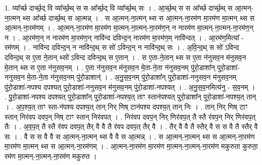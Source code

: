 \documentclass[17pt]{extarticle}
\begin{document}
1. व्या᳚र्च्छ दार्च्छ॒द् वि व्या᳚र्च्छ॒थ् स स आ᳚र्च्छ॒द् वि व्या᳚र्च्छ॒थ् सः । . आ॒र्च्छ॒थ् स स आ᳚र्च्छ दार्च्छ॒थ् स आ॒त्मन्-ना॒त्मन् थ्स आ᳚र्च्छ दार्च्छ॒थ् स आ॒त्मन्न् । . स आ॒त्मन्-ना॒त्मन् थ्स स आ॒त्मन्-ना॒रम॑ण मा॒रम॑ण मा॒त्मन् थ्स स आ॒त्मन्-ना॒रम॑णम् । . आ॒त्मन्-ना॒रम॑ण मा॒रम॑ण मा॒त्मन्-ना॒त्मन्-ना॒रम॑ण॒न् न नारम॑ण मा॒त्मन्-ना॒त्मन्-ना॒रम॑ण॒न् न । . आ॒रम॑ण॒न् न नारम॑ण मा॒रम॑ण॒न् नावि॑न्द दविन्द॒न् नारम॑ण मा॒रम॑ण॒म् नावि॑न्दत् । . आ॒रम॑ण॒मित्या᳚ - रम॑णम् । . नावि॑न्द दविन्द॒न् न नावि॑न्द॒थ् स सो॑ ऽविन्द॒न् न नावि॑न्द॒थ् सः । . अ॒वि॒न्द॒थ् स सो॑ ऽविन्द दविन्द॒थ् स ए॒ता ने॒तान् थ्सो॑ ऽविन्द दविन्द॒थ् स ए॒तान् । . स ए॒ता-ने॒तान् थ्स स ए॒ता न॑नुसव॒न म॑नुसव॒न मे॒तान् थ्स स ए॒ता न॑नुसव॒नम् । . ए॒ता न॑नुसव॒न म॑नुसव॒न मे॒ता-ने॒ता न॑नुसव॒नम् पु॑रो॒डाशा᳚न् पुरो॒डाशा॑-ननुसव॒न मे॒ता-ने॒ता न॑नुसव॒नम् पु॑रो॒डाशान्॑ । . अ॒नु॒स॒व॒नम् पु॑रो॒डाशा᳚न् पुरो॒डाशा॑-ननुसव॒न म॑नुसव॒नम् पु॑रो॒डाशा॑-नपश्य दपश्यत् पुरो॒डाशा॑-ननुसव॒न म॑नुसव॒नम् पु॑रो॒डाशा॑-नपश्यत् । . अ॒नु॒स॒व॒नमित्य॑नु - स॒व॒नम् । . पु॒रो॒डाशा॑-नपश्य दपश्यत् पुरो॒डाशा᳚न् पुरो॒डाशा॑-नपश्य॒त् ताꣳ स्तान॑पश्यत् पुरो॒डाशा᳚न् पुरो॒डाशा॑-नपश्य॒त् तान् । . अ॒प॒श्य॒त् ताꣳ स्ता-न॑पश्य दपश्य॒त् तान् निर् णिष् टान॑पश्य दपश्य॒त् तान् निः । . तान् निर् णिष् टाꣳ स्तान् निर॑वप दवप॒न् निष् टाꣳ स्तान् निर॑वपत् । . निर॑वप दवप॒न् निर् णिर॑वप॒त् तै स्तै र॑वप॒न् निर् णिर॑वप॒त् तैः । . अ॒व॒प॒त् तै स्तै र॑वप दवप॒त् तैर् वै वै तै र॑वप दवप॒त् तैर् वै । . तैर् वै वै तै स्तैर् वै स स वै तै स्तैर् वै सः । . वै स स वै वै स आ॒त्मन्-ना॒त्मन् थ्स वै वै स आ॒त्मन्न् । . स आ॒त्मन्-ना॒त्मन् थ्स स आ॒त्मन्-ना॒रम॑ण मा॒रम॑ण मा॒त्मन् थ्स स आ॒त्मन्-ना॒रम॑णम् । . आ॒त्मन्-ना॒रम॑ण मा॒रम॑ण मा॒त्मन्-ना॒त्मन्-ना॒रम॑ण मकुरुता कुरुता॒ रम॑ण मा॒त्मन्-ना॒त्मन्-ना॒रम॑ण मकुरुत । \newline
\end{document}
